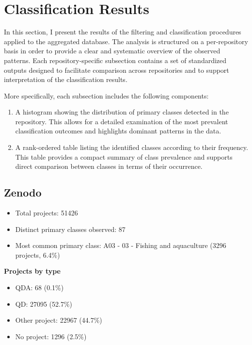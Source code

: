 \section{Classification Results}

In this section, I present the results of the filtering and classification procedures applied to the aggregated database. The analysis is structured on a per-repository basis in order to provide a clear and systematic overview of the observed patterns. Each repository-specific subsection contains a set of standardized outputs designed to facilitate comparison across repositories and to support interpretation of the classification results.

More specifically, each subsection includes the following components:

\begin{enumerate}

    \item A histogram showing the distribution of primary classes detected in the repository. This allows for a detailed examination of the most prevalent classification outcomes and highlights dominant patterns in the data.

    \item A rank-ordered table listing the identified classes according to their frequency. This table provides a compact summary of class prevalence and supports direct comparison between classes in terms of their occurrence.
\end{enumerate}

\subsection{Zenodo}

\begin{itemize}
    \item Total projects: 51426
    \item Distinct primary classes observed: 87
    \item Most common primary class: A03 - 03 - Fishing and aquaculture (3296 projects, 6.4\%)
\end{itemize}
\textbf{Projects by type}
\begin{itemize}
    \item QDA: 68 (0.1\%)
    \item QD: 27095 (52.7\%)
    \item Other project: 22967 (44.7\%)
    \item No project: 1296 (2.5\%)
\end{itemize}

